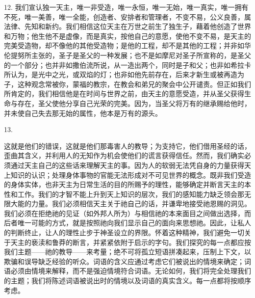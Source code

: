 12. 我们宣认独一天主，唯一非受造，唯一永恒，唯一无始，唯一真实，唯一拥有不死，唯一美善，唯一全能，创造者、安排者和管理者，不变不易，公义良善，属法律、先知和新约。我们相信这位天主在万世之前生了独生子，藉着他创造了世界和万物；他生他不是虚像，而是真实，按他自己的意愿，使他不变不易，是天主的完美受造物，却不像他的其他受造物；是他的工程，却不是其他的工程；并非如华伦提努所主张的，圣子是圣父的一种发展；也不是如摩尼对圣子所宣称的，是圣父的一个部分；也并非如撒伯流所说，从一造出两个，同时是子和父；也非如希拉卡所认为，是光中之光，或双焰的灯；也非如他先前存在，后来才新生或被再造为子，这种观念常被你，蒙福的教宗，在教会和弟兄的聚会中公开谴责。但正如我们所肯定的，我们相信他是在时间与世界之前，由天主的意愿受造，并从圣父获得生命与存在，圣父使他分享自己光荣的完美。因为，当圣父将万有的继承赐给他时，并未使自己失去那无始的属性，他本是万有的源头。\par

13. \par

这就是他们的错误，这就是他们那毒害人的教导；为支持它，他们借用圣经的话，歪曲其含义，并利用人的无知作为机会使他们的谎言获得信任。然而，我们确实必须通过天主自己的这些话来理解天主的事。因为人的软弱无法凭自身的力量获得天上知识的认识；处理身体事物的官能无法形成对不可见世界的概念。既非我们受造的身体实体，也非天主为日常生活的目的所赐予的理性，能够确定并断言天主的本性和工作。我们的才智不能上升到天上知识的层次，我们的感知能力缺乏领会那无限大能的力量。我们必须相信天主关于祂自己的话，并谦卑地接受祂恩赐的洞见。我们必须在拒绝祂的见证（如外邦人所为）与相信祂的本来面目之间做出选择，而后者唯一可能的方式，就是按照祂向我们显示自己的面向来思想祂。因此，让私人的判断终止，让人的理性止步于神圣设立的界限。怀着这种精神，我们避免一切关于天主的亵渎和鲁莽的断言，并紧紧依附于启示的字句。我们探究的每一点都应按我们主题——祂的教导——来考量；绝不可将孤立短语拼凑起来，压制上下文，以欺骗和误导缺乏经验的听众。词语的含义应通过考虑它们被说出的情境来确定；词语必须由情境来解释，而不是强迫情境符合词语。无论如何，我们将完全处理我们的主题；我们将陈述词语被说出时的情境以及词语的真实含义。每一点都将按顺序考虑。\par

